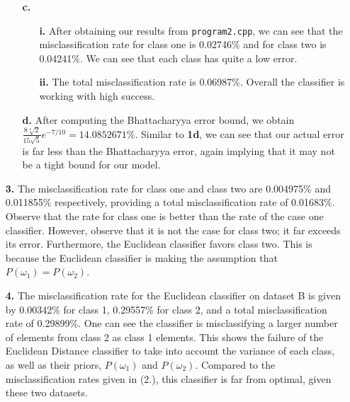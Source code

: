 \documentclass[ 12pt ]{article}
\begin{document}
\begin{enumerate}
\begin{enumerate}
            \item[\textbf{c.}]
                \begin{enumerate}
                    \item[\textbf{i.}] After obtaining our results from \verb|program2.cpp|, we can see that the misclassification rate for class one is 0.02746\% and for class
                        two is 0.04241\%. We can see that each class has quite a low error.
                    \item[\textbf{ii.}] The total misclassification rate is 0.06987\%. Overall the classifier is working with high success.
                \end{enumerate}

            \item[\textbf{d.}] After computing the Bhattacharyya error bound, we obtain $\frac{8 \sqrt[4]{2}}{15 \sqrt{5}} e^{-7/10} = 14.0852671\%$. Similar to \textbf{1d}, we can see
                that our actual error is far less than the Bhattacharyya error, again implying that it may not be a tight bound for our model.
        \end{enumerate}

    \item[\textbf{3.}] The misclassification rate for class one and class two are 0.004975\% and 0.011855\% respectively, providing a total misclassification rate of 0.01683\%. Observe that the rate for class one is better than the rate of the case one classifier. However, observe that it is not the case for class two; it far exceeds its error. Furthermore, the Euclidean classifier favors class two. This is because the Euclidean classifier is making the assumption that $P(\omega_1) = P(\omega_2)$.

    \item[\textbf{4.}] The misclassification rate for the Euclidean classifier on dataset B is given by 0.00342\% for class 1, 0.29557\% for class 2, and a total misclassification rate of 0.29899\%. One can see the classifier is misclassifying a larger number of elements from class 2 as class 1 elements. This shows the failure of the Euclidean Distance classifier to take into account the variance of each class, as well as their priors, $P(\omega_1)$ and $P(\omega_2)$. Compared to the misclassification rates given in (2.), this classifier is far from optimal, given these two datasets.

\end{enumerate}
\end{document}
